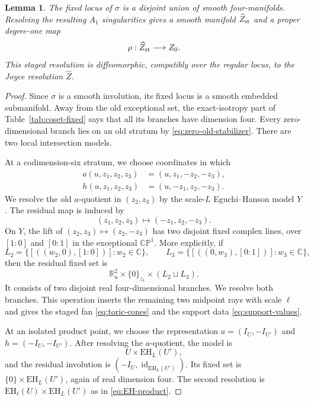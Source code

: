 \documentclass[11pt]{article}
\newtheorem{lemma}[theorem]{Lemma}
\theoremstyle{remark}\newtheorem{remark}[theorem]{Remark}
\newcommand{\EH}{\mathrm{EH}}
\newcommand{\R}{\mathbb R}
\newcommand{\C}{\mathbb C}
\newcommand{\CP}{\mathbb {CP}}
\newcommand{\id}{\operatorname{id}}
\begin{document}
\begin{lemma}\label{lem:two-stage}
The fixed locus of $\sigma$ is a disjoint union of smooth four-manifolds.
Resolving the resulting $A_1$ singularities gives a smooth manifold
$\widehat Z_{\rm st}$ and a proper degree-one map
\begin{equation}\label{eq:rho}\rho:\widehat Z_{\rm st}\longrightarrow Z_0.\end{equation}
This staged resolution is diffeomorphic, compatibly over the regular locus,
to the Joyce resolution $\widehat Z$.
\end{lemma}
\begin{proof}
Since $\sigma$ is a smooth involution, its fixed locus is a smooth embedded
submanifold.  Away from the old exceptional set, the exact-isotropy part of
Table~\ref{tab:coset-fixed} says that all its branches have dimension four.
Every zero-dimensional branch lies on an old stratum by
\eqref{eq:zero-old-stabilizer}.  There are two local intersection models.

At a codimension-six stratum, we choose coordinates in which
\begin{align}\label{eq:stage-SU3}
a(u,z_1,z_2,z_3)&=(u,z_1,-z_2,-z_3),\\
h(u,z_1,z_2,z_3)&=(u,-z_1,z_2,-z_3).\nonumber
\end{align}
We resolve the old $a$-quotient in $(z_2,z_3)$ by the scale-$L$
Eguchi--Hanson model $Y$.  The residual map is
induced by
\[
(z_1,z_2,z_3)\longmapsto(-z_1,z_2,-z_3).
\]
On $Y$, the lift of
$(z_2,z_3)\mapsto(z_2,-z_3)$ has two disjoint fixed complex lines, over
$[1:0]$ and $[0:1]$ in the exceptional $\CP^1$.  More explicitly, if
\[
L_2=\{[((w_2,0),[1:0])]:w_2\in\C\},\qquad
L_3=\{[((0,w_3),[0:1])]:w_3\in\C\},
\]
then the residual fixed set is
\[
\R^2_u\times\{0\}_{z_1}\times(L_2\sqcup L_3).
\]
It consists of two disjoint real four-dimensional branches.  We resolve
both branches.  This operation inserts the remaining two midpoint rays
with scale $\ell$ and gives the staged fan
\eqref{eq:toric-cones} and the support data \eqref{eq:support-values}.

At an isolated product point, we choose the representation
$a=(I_U,-I_{U'})$ and $h=(-I_U,-I_{U'})$.
After resolving the $a$-quotient, the model is
\[
 U\times\EH_L(U'),
\]
and the residual involution is
$(-I_U,\id_{\EH_L(U')})$.  Its fixed set is
$\{0\}\times\EH_L(U')$, again of real dimension four.  The second
resolution is
$\EH_\ell(U)\times\EH_L(U')$ as in \eqref{eq:EH-product}.


\end{proof}
\end{document}
